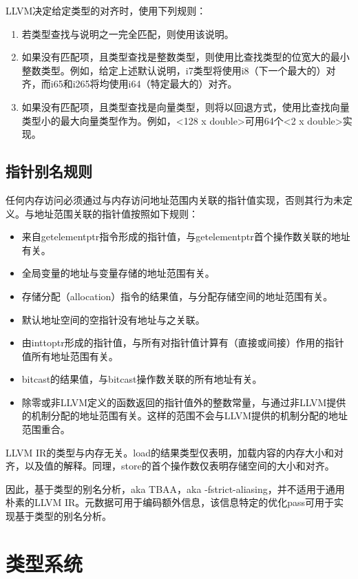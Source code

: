 \documentclass[12pt,a4paper]{article}
\begin{document}
{LLVM决定给定类型的对齐时，使用下列规则：

\begin{enumerate}
\item 若类型查找与说明之一完全匹配，则使用该说明。
\item 如果没有匹配项，且类型查找是整数类型，则使用比查找类型的位宽大的最小整数类型。例如，给定上述默认说明，i7类型将使用i8（下一个最大的）对齐，而i65和i265将均使用i64（特定最大的）对齐。
\item 如果没有匹配项，且类型查找是向量类型，则将以回退方式，使用比查找向量类型小的最大向量类型作为。例如，<128 x double>可用64个<2 x double>实现。
\end{enumerate}

\subsection{指针别名规则}

任何内存访问必须通过与内存访问地址范围内关联的指针值实现，否则其行为未定义。与地址范围关联的指针值按照如下规则：

\begin{itemize}
\item 来自getelementptr指令形成的指针值，与getelementptr首个操作数关联的地址有关。
\item 全局变量的地址与变量存储的地址范围有关。
\item 存储分配（allocation）指令的结果值，与分配存储空间的地址范围有关。
\item 默认地址空间的空指针没有地址与之关联。
\item 由inttoptr形成的指针值，与所有对指针值计算有（直接或间接）作用的指针值所有地址范围有关。
\item bitcast的结果值，与bitcast操作数关联的所有地址有关。
\item 除零或非LLVM定义的函数返回的指针值外的整数常量，与通过非LLVM提供的机制分配的地址范围有关。这样的范围不会与LLVM提供的机制分配的地址范围重合。
\end{itemize}

LLVM IR的类型与内存无关。load的结果类型仅表明，加载内容的内存大小和对齐，以及值的解释。同理，store的首个操作数仅表明存储空间的大小和对齐。

因此，基于类型的别名分析，aka TBAA，aka -fstrict-aliasing，并不适用于通用朴素的LLVM IR。元数据可用于编码额外信息，该信息特定的优化pass可用于实现基于类型的别名分析。

\section{类型系统}

}
\end{document}
